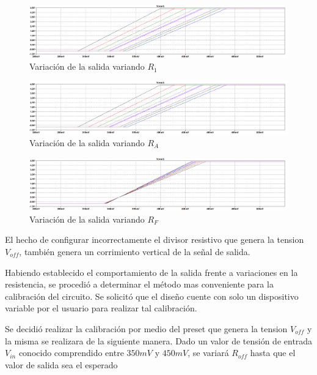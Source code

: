 \begin{figure}[H]
\centering
\includegraphics[scale=0.4]{../parte6/Informe/resources/montecarlo_R1.png}
\caption{Variación de la salida variando $R_1$}
\label{6_mR1}
\end{figure}

\begin{figure}[H]
\centering
\includegraphics[scale=0.4]{../parte6/Informe/resources/montecarlo_RA.png}
\caption{Variación de la salida variando $R_A$}
\label{6_mRA}
\end{figure}

\begin{figure}[H]
\centering
\includegraphics[scale=0.4]{../parte6/Informe/resources/montecarlo_RF.png}
\caption{Variación de la salida variando $R_F$}
\label{6_mRF}
\end{figure}

El hecho de configurar incorrectamente el divisor resistivo que genera la tension $V_{off}$, también genera un corrimiento vertical de la señal de salida.

Habiendo establecido el comportamiento de la salida frente a variaciones en la resistencia, se procedió a determinar el método mas conveniente para la calibración del circuito. Se solicitó que el diseño cuente con solo un dispositivo variable por el usuario para realizar tal calibración. 

Se decidió realizar la calibración por medio del preset que genera la tension $V_{off}$ y la misma se realizara de la siguiente manera. Dado un valor de tensión de entrada $V_{in}$ conocido comprendido entre $350mV$ y $450mV$, se variará $R_{off}$ hasta que el valor de salida sea el esperado


